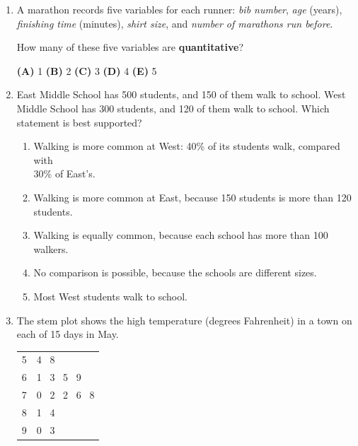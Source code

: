 \documentclass[12pt]{article}
\begin{document}
\begin{enumerate}[leftmargin=1.9em, itemsep=0.13in]

  \boxguard[8]
  \item A marathon records five variables for each runner: \emph{bib number}, \emph{age}
        (years), \emph{finishing time} (minutes), \emph{shirt size}, and \emph{number of
        marathons run before}.

        How many of these five variables are \textbf{quantitative}?\hfill{}\rule[-0.2in]{0pt}{0.48in}
        \par\vspace{3pt}\noindent
        \hspace{1.2em}\textbf{(A)} 1 \hfill \textbf{(B)} 2 \hfill
        \textbf{(C)} 3 \hfill \textbf{(D)} 4 \hfill \textbf{(E)} 5

  \boxguard[11]
  \item East Middle School has 500 students, and 150 of them walk to school. West Middle
        School has 300 students, and 120 of them walk to school. Which statement is best
        supported?
        \begin{enumerate}[label=\textbf{(\Alph*)}, leftmargin=2.2em, itemsep=2pt]
          \item Walking is more common at West: 40\% of its students walk, compared with\\
                30\% of East's.
          \item Walking is more common at East, because 150 students is more than 120 students.
          \item Walking is equally common, because each school has more than 100 walkers.
          \item No comparison is possible, because the schools are different sizes.
          \item Most West students walk to school.\hfill{}\rule[-0.2in]{0pt}{0.48in}
        \end{enumerate}

  \boxguard[13]
  \item The stem plot shows the high temperature (degrees Fahrenheit) in a town on each of
        15 days in May.

        \vspace{3pt}
        {\centering\small
        \renewcommand{\arraystretch}{1.05}
        \begin{tabular}{@{} r | l @{}}
        5 & 4 \ 8 \\
        6 & 1 \ 3 \ 5 \ 9 \\
        7 & 0 \ 2 \ 2 \ 6 \ 8 \\
        8 & 1 \ 4 \\
        9 & 0 \ 3 \\
        \end{tabular}\qquad
        \par}
        \vspace{2pt}


\end{enumerate}
\end{document}
